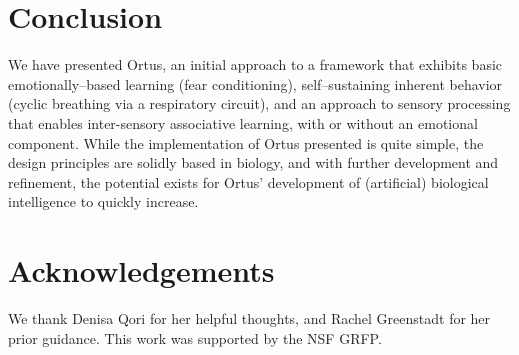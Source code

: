 \documentclass[letterpaper]{article}
\begin{document}
\section{Conclusion}
We have presented Ortus, an initial approach to a framework that exhibits basic emotionally--based learning (fear conditioning), self--sustaining inherent behavior (cyclic breathing via a respiratory circuit), and an approach to sensory processing that enables inter-sensory associative learning, with or without an emotional component. While the implementation of Ortus presented is quite simple, the design principles are solidly based in biology, and with further development and refinement, the potential exists for Ortus' development of (artificial) biological intelligence to quickly increase. %


\section{Acknowledgements}

We thank Denisa Qori for her helpful thoughts, and Rachel Greenstadt for her prior guidance.
This work was supported by the NSF GRFP. 

\footnotesize

\end{document}
